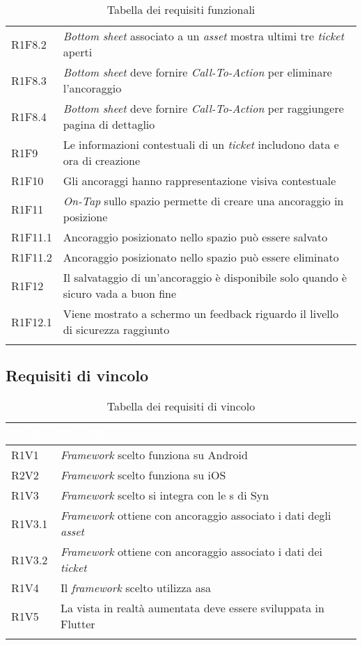 {\begin{longtable}{C{.15\freewidth} | C{1\freewidth}}
    R1F8.2 & \textit{Bottom sheet} associato a un \textit{asset} mostra ultimi tre \textit{ticket} aperti\\
    R1F8.3 & \textit{Bottom sheet} deve fornire \textit{Call-To-Action} per eliminare l'ancoraggio\\
    R1F8.4 & \textit{Bottom sheet} deve fornire \textit{Call-To-Action} per raggiungere pagina di dettaglio\\
    R1F9 & Le informazioni contestuali di un \textit{ticket} includono data e ora di creazione\\
    R1F10 & Gli ancoraggi hanno rappresentazione visiva contestuale\\ 
    R1F11 & \textit{On-Tap} sullo spazio permette di creare una ancoraggio in posizione\\
    R1F11.1 & Ancoraggio posizionato nello spazio può essere salvato\\
    R1F11.2 & Ancoraggio posizionato nello spazio può essere eliminato\\
    R1F12 & Il salvataggio di un'ancoraggio è disponibile solo quando è sicuro vada a buon fine\\
    R1F12.1 & Viene mostrato a schermo un feedback riguardo il livello di sicurezza raggiunto\\
    \bottomrule
    \caption{Tabella dei requisiti funzionali}
    \label{tab:requisiti-funzionali}
    \end{longtable}
}

\subsection{Requisiti di vincolo}
{
    \setlength{\freewidth}{\dimexpr\textwidth-10\tabcolsep}
    \renewcommand{\arraystretch}{1.5}
    \centering
    \setlength{\aboverulesep}{0pt}
    \setlength{\belowrulesep}{0pt}
    \begin{longtable}{C{.15\freewidth} C{1\freewidth}} 
       \toprule
    \textcolor{white}{\textbf{Codice}}&
    \textcolor{white}{\textbf{Descrizione}}\\
    \toprule
    \endhead

    R1V1 & \textit{Framework} scelto funziona su Android\\
    R2V2 & \textit{Framework} scelto funziona su iOS\\
    R1V3 & \textit{Framework} scelto si integra con le \api{}s di Syn\\
    R1V3.1 & \textit{Framework} ottiene con ancoraggio associato i dati degli \textit{asset}\\
    R1V3.2 & \textit{Framework} ottiene con ancoraggio associato i dati dei \textit{ticket}\\
    R1V4 & Il \textit{framework} scelto utilizza asa\\
    R1V5 & La vista in realtà aumentata deve essere sviluppata in Flutter\\
    \bottomrule
    \caption{Tabella dei requisiti di vincolo}
    \label{tab:requisiti-di-vincolo}
    \end{longtable}
}

